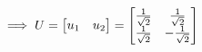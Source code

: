 \documentclass[preview]{standalone}
\begin{document}
\begin{align*}
\special{dvisvgm:raw <g id='unique000'>}\implies U = \begin{bmatrix} u_1 & u_2 \end{bmatrix} = \begin{bmatrix} \frac{1}{\sqrt{2}} & \frac{1}{\sqrt{2}} \\ \frac{1}{\sqrt{2}} & -\frac{1}{\sqrt{2}} \end{bmatrix}\special{dvisvgm:raw </g>}
\end{align*}
\end{document}
